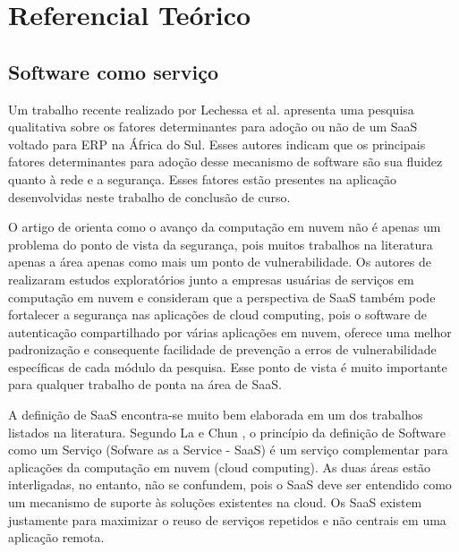 \chapter{Referencial Teórico}


 \section{Software como serviço}\label{sec:saas}


Um trabalho recente realizado por Lechessa et al. \cite{LechesaSS11} apresenta uma pesquisa qualitativa sobre os fatores determinantes para adoção ou não de um SaaS voltado para ERP na África do Sul. Esses autores indicam que os principais fatores determinantes para adoção desse mecanismo de software são sua fluidez quanto à rede e a segurança. Esses fatores estão presentes na aplicação desenvolvidas neste trabalho de conclusão de curso.
 

O artigo de \citep{journals/corr/RaiSM13} orienta como o avanço da computação em nuvem não é apenas um problema do ponto de vista da segurança, pois muitos trabalhos na literatura apenas a área apenas como mais um ponto de vulnerabilidade. Os autores de \citep{journals/corr/RaiSM13} realizaram estudos exploratórios junto a empresas usuárias de serviços em computação em nuvem e consideram que a perspectiva de SaaS também pode fortalecer a segurança nas aplicações de cloud computing, pois o software de autenticação compartilhado por várias aplicações em nuvem, oferece uma melhor padronização e consequente facilidade de prevenção a erros de vulnerabilidade específicas de cada módulo da pesquisa. Esse ponto de vista é muito importante para qualquer trabalho de ponta na área de SaaS.


A definição de SaaS encontra-se muito bem elaborada em um dos trabalhos listados na literatura. Segundo La e Chun \citep{La2009Systematic}, o princípio da definição de Software como um Serviço (Sofware as a Service - SaaS) é um serviço complementar para aplicações da computação em nuvem (cloud computing). As duas áreas estão interligadas, no entanto, não se confundem, pois o SaaS deve ser entendido como um mecanismo de suporte às soluções existentes na cloud. Os SaaS existem justamente para maximizar o reuso de serviços repetidos e não centrais em uma aplicação remota.


